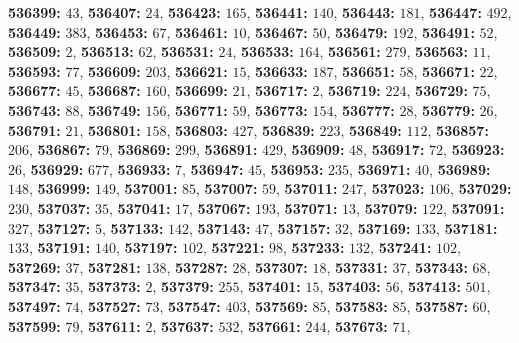 \textsf{\bfseries 536399:} $43$, \textsf{\bfseries 536407:} $24$, \textsf{\bfseries 536423:} $165$, \textsf{\bfseries 536441:} $140$, \textsf{\bfseries 536443:} $181$, \textsf{\bfseries 536447:} $492$, \textsf{\bfseries 536449:} $383$, \textsf{\bfseries 536453:} $67$, \textsf{\bfseries 536461:} $10$, \textsf{\bfseries 536467:} $50$, \textsf{\bfseries 536479:} $192$, \textsf{\bfseries 536491:} $52$, \textsf{\bfseries 536509:} $2$, \textsf{\bfseries 536513:} $62$, \textsf{\bfseries 536531:} $24$, \textsf{\bfseries 536533:} $164$, \textsf{\bfseries 536561:} $279$, \textsf{\bfseries 536563:} $11$, \textsf{\bfseries 536593:} $77$, \textsf{\bfseries 536609:} $203$, \textsf{\bfseries 536621:} $15$, \textsf{\bfseries 536633:} $187$, \textsf{\bfseries 536651:} $58$, \textsf{\bfseries 536671:} $22$, \textsf{\bfseries 536677:} $45$, \textsf{\bfseries 536687:} $160$, \textsf{\bfseries 536699:} $21$, \textsf{\bfseries 536717:} $2$, \textsf{\bfseries 536719:} $224$, \textsf{\bfseries 536729:} $75$, \textsf{\bfseries 536743:} $88$, \textsf{\bfseries 536749:} $156$, \textsf{\bfseries 536771:} $59$, \textsf{\bfseries 536773:} $154$, \textsf{\bfseries 536777:} $28$, \textsf{\bfseries 536779:} $26$, \textsf{\bfseries 536791:} $21$, \textsf{\bfseries 536801:} $158$, \textsf{\bfseries 536803:} $427$, \textsf{\bfseries 536839:} $223$, \textsf{\bfseries 536849:} $112$, \textsf{\bfseries 536857:} $206$, \textsf{\bfseries 536867:} $79$, \textsf{\bfseries 536869:} $299$, \textsf{\bfseries 536891:} $429$, \textsf{\bfseries 536909:} $48$, \textsf{\bfseries 536917:} $72$, \textsf{\bfseries 536923:} $26$, \textsf{\bfseries 536929:} $677$, \textsf{\bfseries 536933:} $7$, \textsf{\bfseries 536947:} $45$, \textsf{\bfseries 536953:} $235$, \textsf{\bfseries 536971:} $40$, \textsf{\bfseries 536989:} $148$, \textsf{\bfseries 536999:} $149$, \textsf{\bfseries 537001:} $85$, \textsf{\bfseries 537007:} $59$, \textsf{\bfseries 537011:} $247$, \textsf{\bfseries 537023:} $106$, \textsf{\bfseries 537029:} $230$, \textsf{\bfseries 537037:} $35$, \textsf{\bfseries 537041:} $17$, \textsf{\bfseries 537067:} $193$, \textsf{\bfseries 537071:} $13$, \textsf{\bfseries 537079:} $122$, \textsf{\bfseries 537091:} $327$, \textsf{\bfseries 537127:} $5$, \textsf{\bfseries 537133:} $142$, \textsf{\bfseries 537143:} $47$, \textsf{\bfseries 537157:} $32$, \textsf{\bfseries 537169:} $133$, \textsf{\bfseries 537181:} $133$, \textsf{\bfseries 537191:} $140$, \textsf{\bfseries 537197:} $102$, \textsf{\bfseries 537221:} $98$, \textsf{\bfseries 537233:} $132$, \textsf{\bfseries 537241:} $102$, \textsf{\bfseries 537269:} $37$, \textsf{\bfseries 537281:} $138$, \textsf{\bfseries 537287:} $28$, \textsf{\bfseries 537307:} $18$, \textsf{\bfseries 537331:} $37$, \textsf{\bfseries 537343:} $68$, \textsf{\bfseries 537347:} $35$, \textsf{\bfseries 537373:} $2$, \textsf{\bfseries 537379:} $255$, \textsf{\bfseries 537401:} $15$, \textsf{\bfseries 537403:} $56$, \textsf{\bfseries 537413:} $501$, \textsf{\bfseries 537497:} $74$, \textsf{\bfseries 537527:} $73$, \textsf{\bfseries 537547:} $403$, \textsf{\bfseries 537569:} $85$, \textsf{\bfseries 537583:} $85$, \textsf{\bfseries 537587:} $60$, \textsf{\bfseries 537599:} $79$, \textsf{\bfseries 537611:} $2$, \textsf{\bfseries 537637:} $532$, \textsf{\bfseries 537661:} $244$, \textsf{\bfseries 537673:} $71$, 

